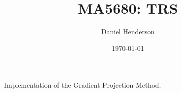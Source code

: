 \documentclass[10pt]{article}
\title{MA5680: TRS}
\author{Daniel Henderson}
\date{\today}
\begin{document}
\maketitle

\noindent Implementation of the Gradient Projection Method.
    
\end{document}
